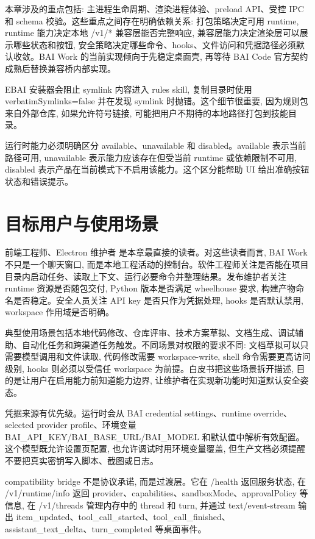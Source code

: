 本章涉及的重点包括: 主进程生命周期、渲染进程体验、preload API、受控 IPC 和 schema 校验。这些重点之间存在明确依赖关系: 打包策略决定可用 runtime, runtime 能力决定本地 /v1/* 兼容层能否完整响应, 兼容层能力决定渲染层可以展示哪些状态和按钮, 安全策略决定哪些命令、hooks、文件访问和凭据路径必须默认收敛。BAI Work 的当前实现倾向于先稳定桌面壳, 再等待 BAI Code 官方契约成熟后替换兼容桥内部实现。

EBAI 安装器会阻止 symlink 内容进入 rules skill, 复制目录时使用 verbatimSymlinks=false 并在发现 symlink 时抛错。这个细节很重要, 因为规则包来自外部仓库, 如果允许符号链接, 可能把用户不期待的本地路径打包到技能目录。

运行时能力必须明确区分 available、unavailable 和 disabled。available 表示当前路径可用, unavailable 表示能力应该存在但受当前 runtime 或依赖限制不可用, disabled 表示产品在当前模式下不启用该能力。这个区分能帮助 UI 给出准确按钮状态和错误提示。

\section{目标用户与使用场景}
前端工程师、Electron 维护者 是本章最直接的读者。对这些读者而言, BAI Work 不只是一个聊天窗口, 而是本地工程活动的控制台。软件工程师关注是否能在项目目录内启动任务、读取上下文、运行必要命令并整理结果。发布维护者关注 runtime 资源是否随包交付, Python 版本是否满足 wheelhouse 要求, 构建产物命名是否稳定。安全人员关注 API key 是否只作为凭据处理, hooks 是否默认禁用, workspace 作用域是否明确。

典型使用场景包括本地代码修改、仓库评审、技术方案草拟、文档生成、调试辅助、自动化任务和跨渠道任务触发。不同场景对权限的要求不同: 文档草拟可以只需要模型调用和文件读取, 代码修改需要 workspace-write, shell 命令需要更高访问级别, hooks 则必须以受信任 workspace 为前提。白皮书把这些场景拆开描述, 目的是让用户在启用能力前知道能力边界, 让维护者在实现新功能时知道默认安全姿态。

凭据来源有优先级。运行时会从 BAI credential settings、runtime override、selected provider profile、环境变量 BAI\_API\_KEY/BAI\_BASE\_URL/BAI\_MODEL 和默认值中解析有效配置。这个模型既允许设置页配置, 也允许调试时用环境变量覆盖, 但生产文档必须提醒不要把真实密钥写入脚本、截图或日志。

compatibility bridge 不是协议承诺, 而是过渡层。它在 /health 返回服务状态, 在 /v1/runtime/info 返回 provider、capabilities、sandboxMode、approvalPolicy 等信息, 在 /v1/threads 管理内存中的 thread 和 turn, 并通过 text/event-stream 输出 item\_updated、tool\_call\_started、tool\_call\_finished、assistant\_text\_delta、turn\_completed 等桌面事件。

